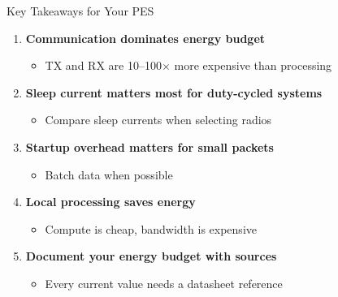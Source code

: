\documentclass[aspectratio=169,11pt]{beamer}
\begin{document}
\begin{frame}{Key Takeaways for Your PES}
    \begin{enumerate}
        \item \textbf{Communication dominates energy budget}
        \begin{itemize}
            \item TX and RX are 10--100$\times$ more expensive than processing
        \end{itemize}
        
        \item \textbf{Sleep current matters most for duty-cycled systems}
        \begin{itemize}
            \item Compare sleep currents when selecting radios
        \end{itemize}
        
        \item \textbf{Startup overhead matters for small packets}
        \begin{itemize}
            \item Batch data when possible
        \end{itemize}
        
        \item \textbf{Local processing saves energy}
        \begin{itemize}
            \item Compute is cheap, bandwidth is expensive
        \end{itemize}
        
        \item \textbf{Document your energy budget with sources}
        \begin{itemize}
            \item Every current value needs a datasheet reference
        \end{itemize}
    \end{enumerate}
\end{frame}
\end{document}
